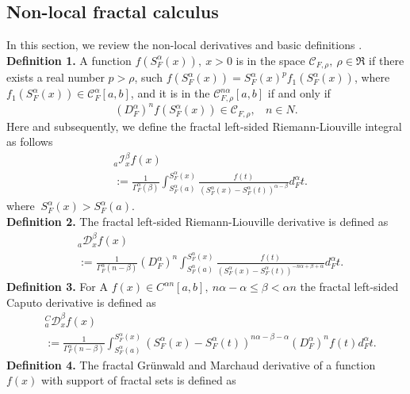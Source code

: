 \documentclass[12pt]{article}
\begin{document}
\subsection{Non-local fractal calculus}
In this section, we review  the non-local derivatives and basic definitions \cite{Golmankhaneh-107-k}.\\
\textbf{Definition 1.} A function $f(S_{F}^{\alpha}(x)),~ x>0$ is in the space $\mathcal{C}_{F,\rho}, ~\rho\in \Re$ if there exists a real number $p>\rho$, such  $f(S_{F}^{\alpha}(x))=S_{F}^{\alpha}(x)^{p} f_{1}(S_{F}^{\alpha}(x))$, where $f_{1}(S_{F}^{\alpha}(x))\in \mathcal{C}_{F}^{\alpha}[a,b]$, and it is in the $\mathcal{C}_{F,\rho}^{n\alpha}[a,b]$ if and only if
\begin{equation}
(D_{F}^{\alpha})^{n} f(S_{F}^{\alpha}(x))\in \mathcal{C}_{F,\rho},~~~~ n\in N.
\end{equation}
Here and subsequently, we define the fractal left-sided  Riemann-Liouville  integral as follows
 \begin{align}\label{xsaz125}
 & _{a}\mathcal{I}_{x}^{\beta}f(x)\nonumber\\&:=\frac{1}{\Gamma^{\alpha}_{F}(\beta)}\int_{S_{F}^{\alpha}(a)}^ {S_{F}^{\alpha}(x)}\frac{f(t)}{(S_{F}^{\alpha}(x)-S_{F}^{\alpha}(t))^{\alpha-\beta}}d_{F}^{\alpha}t.
 \end{align}
 where $~S_{F}^{\alpha}(x)>S_{F}^{\alpha}(a)$.\\
\textbf{Definition 2.} The fractal left-sided Riemann-Liouville  derivative is defined as
\begin{align}\label{gcfrtgffvgf}
 & _{a}\mathcal{D}_{x}^{\beta} f(x)\nonumber\\&:=\frac{1}{\Gamma^{\alpha}_{F}(n-\beta)} (D_{F}^{\alpha})^n
\int_{S_{F}^{\alpha}(a)}^{S_{F}^{\alpha}(x)}\frac{f(t)} {(S_{F}^{\alpha}(x)-S_{F}^{\alpha}(t))^{-n\alpha+\beta+\alpha}}d_{F}^{\alpha}t.
 \end{align}
\textbf{Definition 3.} For A $f(x)\in C^{\alpha n} [a, b],~n\alpha-\alpha\leq\beta <\alpha n$ the fractal left-sided Caputo derivative is defined as
\begin{align}\label{gfvsewgf}
&  _{a}^{C}\mathcal{D}_{x}^{\beta} f(x)\nonumber\\&:=\frac{1}{\Gamma^{\alpha}_{F}(n-\beta)}
\int_{S_{F}^{\alpha}(a)}^{S_{F}^{\alpha}(x)}(S_{F}^{\alpha}(x)-S_{F} ^{\alpha}(t))^{n\alpha-\beta-\alpha} (D_{F}^{\alpha})^nf(t) d_{F}^{\alpha}t.
\end{align}
\textbf{Definition 4.} The fractal Gr\"{u}nwald and Marchaud derivative of a function $f(x)$ with support of fractal sets is defined as
\end{document}
